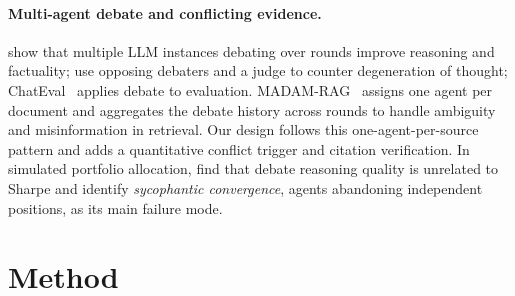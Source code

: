\documentclass[11pt]{article}
\begin{document}
\paragraph{Multi-agent debate and conflicting evidence.}
\citet{du2024debate} show that multiple LLM instances debating over rounds improve reasoning and factuality;
\citet{liang2024divergent} use opposing debaters and a judge to counter degeneration of thought; ChatEval~\citep{chan2024chateval}
applies debate to evaluation. MADAM-RAG~\citep{wang2025madamrag} assigns one agent per document and aggregates the debate
history across rounds to handle ambiguity and misinformation in retrieval. Our design follows this one-agent-per-source
pattern and adds a quantitative conflict trigger and citation verification. In simulated portfolio allocation,
\citet{huang2026debate} find that debate reasoning quality is unrelated to Sharpe and identify \emph{sycophantic
convergence}, agents abandoning independent positions, as its main failure mode.

\section{Method}
\end{document}
